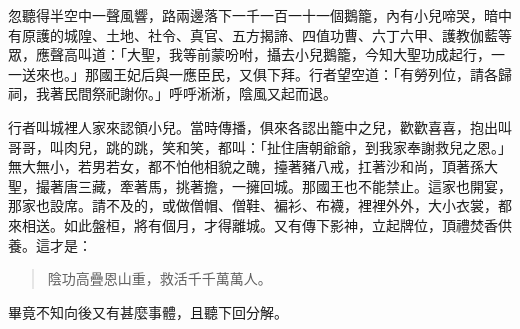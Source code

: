 忽聽得半空中一聲風響，路兩邊落下一千一百一十一個鵝籠，內有小兒啼哭，暗中有原護的城隍、土地、社令、真官、五方揭諦、四值功曹、六丁六甲、護教伽藍等眾，應聲高叫道：「大聖，我等前蒙吩咐，攝去小兒鵝籠，今知大聖功成起行，一一送來也。」那國王妃后與一應臣民，又俱下拜。行者望空道：「有勞列位，請各歸祠，我著民間祭祀謝你。」呼呼淅淅，陰風又起而退。

行者叫城裡人家來認領小兒。當時傳播，俱來各認出籠中之兒，歡歡喜喜，抱出叫哥哥，叫肉兒，跳的跳，笑和笑，都叫：「扯住唐朝爺爺，到我家奉謝救兒之恩。」無大無小，若男若女，都不怕他相貌之醜，擡著豬八戒，扛著沙和尚，頂著孫大聖，撮著唐三藏，牽著馬，挑著擔，一擁回城。那國王也不能禁止。這家也開宴，那家也設席。請不及的，或做僧帽、僧鞋、褊衫、布襪，裡裡外外，大小衣裳，都來相送。如此盤桓，將有個月，才得離城。又有傳下影神，立起牌位，頂禮焚香供養。這才是：
\begin{quote}
陰功高疊恩山重，救活千千萬萬人。
\end{quote}

畢竟不知向後又有甚麼事體，且聽下回分解。
